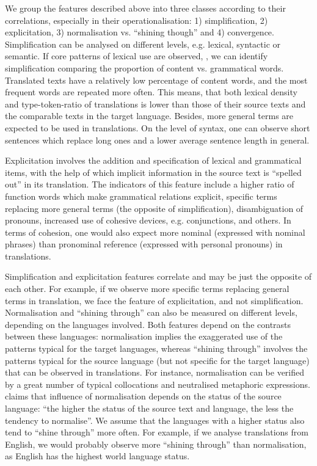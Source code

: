 \documentclass[output=paper]{LSP/langsci}
\begin{document}
We group the features described above into three classes according to their correlations, especially in their operationalisation: 1) simplification, 2) explicitation, 3) normalisation vs. “shining though” and 4) convergence. Simplification can be analysed on different levels, e.g. lexical, syntactic or semantic. If core patterns of lexical use are observed, \citep[see][]{Laviosa1998}, we can identify simplification comparing the proportion of content vs. grammatical words. Translated texts have a relatively low percentage of content words, and the most frequent words are repeated more often. This means, that both lexical density and type-token-ratio of translations is lower than those of their source texts and the comparable texts in the target language.  Besides, more general terms are expected to be used in translations.  On the level of syntax, one can observe short sentences which replace long ones and a lower average sentence length in general.

Explicitation involves the addition and specification of lexical and grammatical items, with the help of which implicit information in the source text is “spelled out” in its translation.  The indicators of this feature include a higher ratio of function words which make grammatical relations explicit, specific terms replacing more general terms (the opposite of simplification), disambiguation of pronouns, increased use of cohesive devices, e.g. conjunctions, and others. In terms of cohesion, one would also expect more nominal (expressed with nominal phrases) than pronominal reference (expressed with personal pronouns) in translations.

Simplification and explicitation features correlate and may be just the opposite of each other.  For example, if we observe more speciﬁc terms replacing general terms in translation, we face the feature of explicitation, and not simplification. Normalisation and “shining through” can also be measured on different levels, depending on the languages involved. Both features depend on the contrasts between these languages: normalisation implies the exaggerated use of the patterns typical for the target languages, whereas “shining through” involves the patterns typical for the source language (but not specific for the target language) that can be observed in translations. For instance, normalisation can be verified by a great number of typical collocations and neutralised metaphoric expressions. \citet{Baker1996} claims that influence of normalisation depends on the status of the source language: “the higher the status of the source text and language, the less the tendency to normalise”. We assume that the languages with a higher status also tend to “shine through” more often. For example, if we analyse translations from English, we would probably observe more “shining through” than normalisation, as English has the highest world language status.
\end{document}

